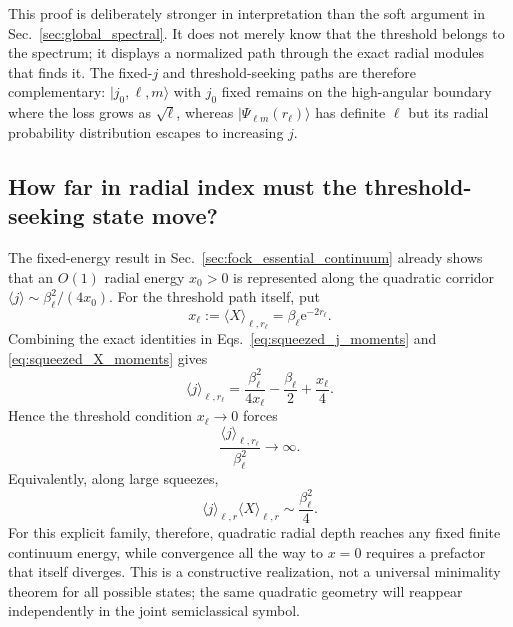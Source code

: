 \documentclass[11pt]{article}
\numberwithin{equation}{section}
\newcommand{\e}{\mathrm e}
\theoremstyle{definition}
\begin{document}
This proof is deliberately stronger in interpretation than the soft argument
in Sec.~\ref{sec:global_spectral}.  It does not merely know that the threshold belongs to the
spectrum; it displays a normalized path through the exact radial modules that
finds it.  The fixed-$j$ and threshold-seeking paths are therefore
complementary: $|j_0,\ell,m\rangle$ with $j_0$ fixed remains on the
high-angular boundary where the loss grows as $\sqrt\ell$, whereas
$|\Psi_{\ell m}(r_\ell)\rangle$ has definite $\ell$ but its radial
probability distribution escapes to increasing $j$.

\subsection{How far in radial index must the threshold-seeking state move?}

The fixed-energy result in Sec.~\ref{sec:fock_essential_continuum} already
shows that an $O(1)$ radial energy $x_0>0$ is represented along the quadratic
corridor $\langle j\rangle\sim\beta_\ell^2/(4x_0)$.  For the threshold
path itself, put
\begin{equation}
 x_\ell:=\langle X\rangle_{\ell,r_\ell}
 =\beta_\ell\e^{-2r_\ell}.
\end{equation}
Combining the exact identities in Eqs.~\eqref{eq:squeezed_j_moments} and
\eqref{eq:squeezed_X_moments} gives
\begin{equation}
 \langle j\rangle_{\ell,r_\ell}
 =\frac{\beta_\ell^2}{4x_\ell}
 -\frac{\beta_\ell}{2}
 +\frac{x_\ell}{4}.
 \label{eq:threshold_j_exact}
\end{equation}
Hence the threshold condition $x_\ell\to0$ forces
\begin{equation}
 \frac{\langle j\rangle_{\ell,r_\ell}}{\beta_\ell^2}
 \longrightarrow\infty.
 \label{eq:superquadratic_threshold_escape}
\end{equation}
Equivalently, along large squeezes,
\begin{equation}
 \langle j\rangle_{\ell,r}
 \langle X\rangle_{\ell,r}
 \sim\frac{\beta_\ell^2}{4}.
 \label{eq:jx_product}
\end{equation}
For this explicit family, therefore, quadratic radial depth reaches any fixed
finite continuum energy, while convergence all the way to $x=0$ requires a
prefactor that itself diverges.  This is a constructive realization, not a
universal minimality theorem for all possible states; the same quadratic
geometry will reappear independently in the joint semiclassical symbol.
\end{document}
